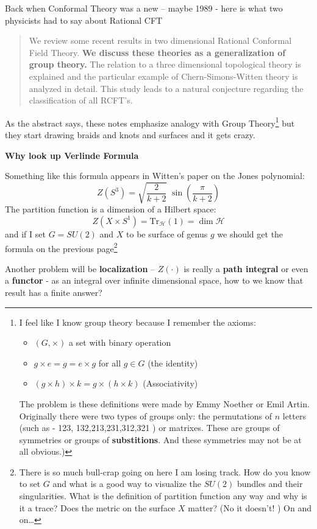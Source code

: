 \documentclass[12pt]{article}
\begin{document}
\noindent Back when Conformal Theory was a new -- maybe 1989 - here is what two physicists had to say about Rational CFT
\begin{quotation}
We review some recent results in two dimensional Rational Conformal Field Theory.  \textbf{We discuss these theories as a generalization of group theory.}  The relation to a three dimensional topological theory is explained and the particular example of Chern-Simons-Witten theory is analyzed in detail.  This study leads to a natural conjecture regarding the classification of all RCFT's.
\end{quotation}
As the abstract says, these notes emphasize analogy with Group Theory\footnote{I feel like I know group theory because I remember the axioms:
\begin{itemize}
\item $(G, \times)$ a set with binary operation
\item $ g \times e = g = e \times g$ for all $g \in G$ (the identity)
\item $ (g \times h )\times k = g \times (h \times k )$ (Associativity)
\end{itemize}
The problem is these definitions were made by Emmy Noether or Emil Artin.  Originally there were two types of groups only: the permutations of $n$ letters (such as - 123, 132,213,231,312,321 ) or matrixes.  These are groups of symmetries or groups of \textbf{substitions}.  And these symmetries may not be at all obvious.)} but they start drawing braids and knots and surfaces and it gets crazy.
\newpage

\noindent \textbf{Why look up Verlinde Formula} \newline

\noindent Something like this formula appears in Witten's paper on the Jones polynomial:
$$ Z(S^3) =  \sqrt{\frac{2}{k+2}} \; \sin \left( \frac{\pi}{k+2}\right) $$
The partition function is a dimension of a Hilbert space:
$$ Z(X \times S^1) = \mathrm{Tr}_\mathcal{H}(1) = \dim \mathcal{H} $$
and if I set $G= SU(2)$ and $X$ to be surface of genus $g$ we should get the formula on the previous page\footnote{There is so much bull-crap going on here I am losing track.  How do you know to set $G$ and what is a good way to visualize the $SU(2)$ bundles and their singularities.  What is the definition of partition function any way and why is it a trace?  Does the metric on the surface $X$ matter?  (No it doesn't! )  On and on\dots} \newpage

\noindent Another problem will be \textbf{localization} -- $Z(\cdot)$ is really a \textbf{path integral} or even a \textbf{functor} - as an integral over infinite dimensional space, how to we know that result has a finite answer?  \newline
\end{document}
